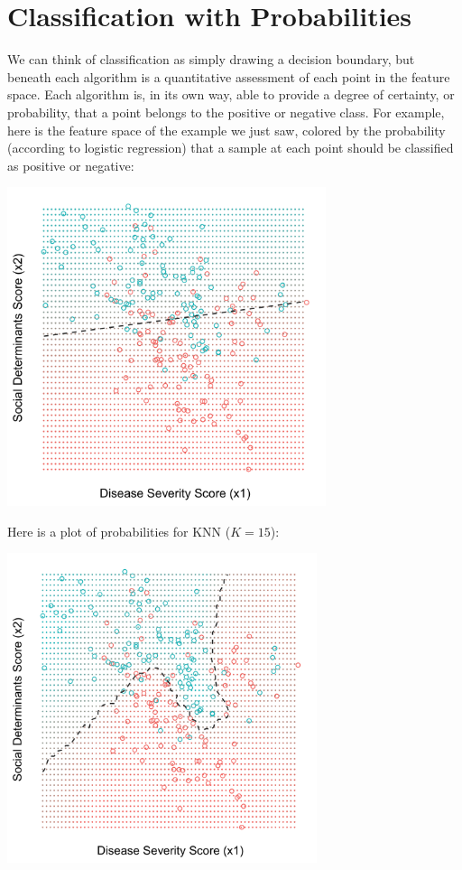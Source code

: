 
\section{Classification with Probabilities}

We can think of classification as simply drawing a decision boundary, but beneath each algorithm is a quantitative assessment of each point in the feature space. Each algorithm is, in its own way, able to provide a degree of certainty, or probability, that a point belongs to the positive or negative class. For example, here is the feature space of the example we just saw, colored by the probability (according to logistic regression) that a sample at each point should be classified as positive or negative: 

\begin{center}
\includegraphics[width=0.7\textwidth]{img/esl-logistic-prob.png}
\end{center}

\noindent Here is a plot of probabilities for KNN ($K=15$): 
\begin{center}
\includegraphics[width=0.68\textwidth]{img/esl-knn-15-prob.png}
\end{center}

